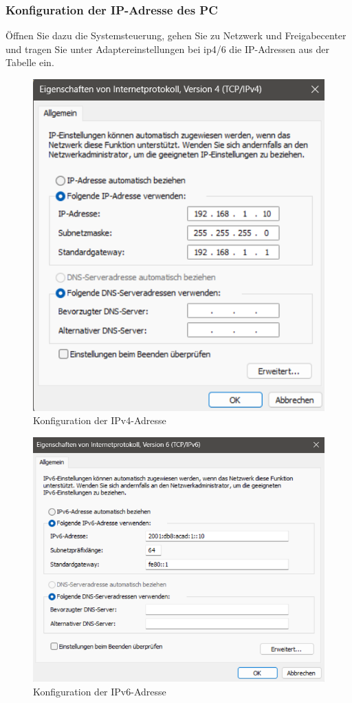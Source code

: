\documentclass[a4paper]{article}
\newcommand{\abc}{\hfill \break}
\begin{document}
\subsubsection{Konfiguration der IP-Adresse des PC}\abc
Öffnen Sie dazu die Systemsteuerung, gehen Sie zu Netzwerk und Freigabecenter und tragen Sie unter Adaptereinstellungen bei ip4/6 die IP-Adressen aus der Tabelle ein.
\begin{figure}[h]
	\centering
	\includegraphics[scale=0.4]{images/ipv4.png}
	\caption{Konfiguration der IPv4-Adresse}
\end{figure}
\begin{figure}[h]
	\centering
	\includegraphics[scale=0.4]{images/ipv6.png}
	\caption{Konfiguration der IPv6-Adresse}
\end{figure}
\end{document}
